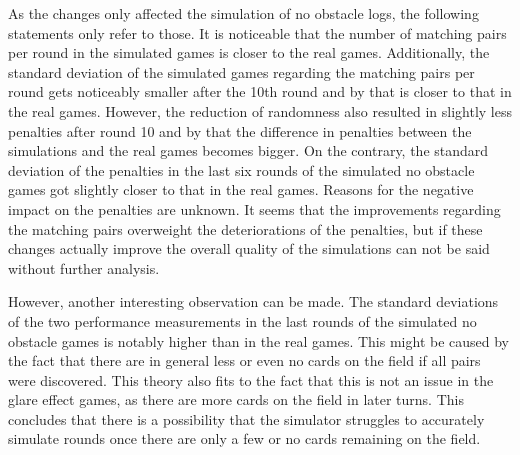 As the changes only affected the simulation of no obstacle logs, the following statements only refer to those. It is noticeable that the number of matching pairs per round in the simulated games is closer to the real games. Additionally, the standard deviation of the simulated games regarding the matching pairs per round gets noticeably smaller after the 10th round and by that is closer to that in the real games. However, the reduction of randomness also resulted in slightly less penalties after round 10 and by that the difference in penalties between the simulations and the real games becomes bigger. On the contrary, the standard deviation of the penalties in the last six rounds of the simulated no obstacle games got slightly closer to that in the real games. Reasons for the negative impact on the penalties are unknown. It seems that the improvements regarding the matching pairs overweight the deteriorations of the penalties, but if these changes actually improve the overall quality of the simulations can not be said without further analysis. 



However, another interesting observation can be made. The standard deviations of the two performance measurements in the last rounds of the simulated no obstacle games is notably higher than in the real games. This might be caused by the fact that there are in general less or even no cards on the field if all pairs were discovered. This theory also fits to the fact that this is not an issue in the glare effect games, as there are more cards on the field in later turns. This concludes that there is a possibility that the simulator struggles to accurately simulate rounds once there are only a few or no cards remaining on the field. 

